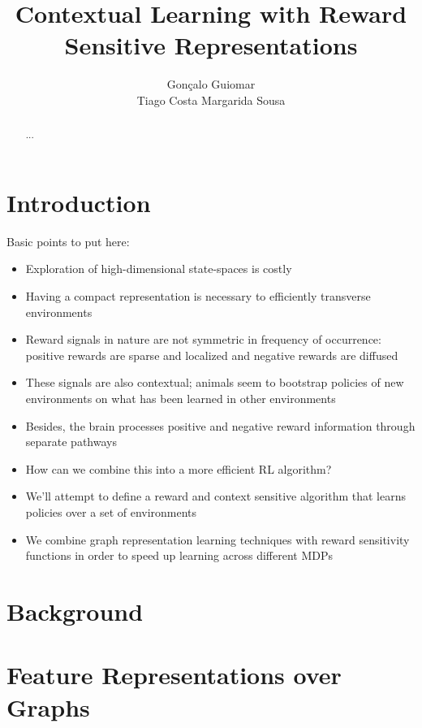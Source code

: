 \documentclass{article}
\title{Contextual Learning with Reward Sensitive Representations}
\author{
  Gonçalo Guiomar \\
  \And
  Tiago Costa
  \And
  Margarida Sousa
}
\begin{document}
\maketitle

\begin{abstract}
  ...
\end{abstract}

\section{Introduction}

Basic points to put here:

\begin{itemize}
  \item Exploration of high-dimensional state-spaces is costly
  \item Having a compact representation is necessary to efficiently transverse environments
  \item Reward signals in nature are not symmetric in frequency of occurrence: positive rewards are sparse and localized and negative rewards are diffused
  \item These signals are also contextual; animals seem to bootstrap policies of new environments on what has been learned in other environments
  \item Besides, the brain processes positive and negative reward information through separate pathways
  \item How can we combine this into a more efficient RL algorithm?
  \item We'll attempt to define a reward and context sensitive algorithm that learns policies over a set of environments
  \item We combine graph representation learning techniques with reward sensitivity functions in order to speed up learning across different MDPs
\end{itemize}

\section{Background}

\section{Feature Representations over Graphs}
\end{document}
